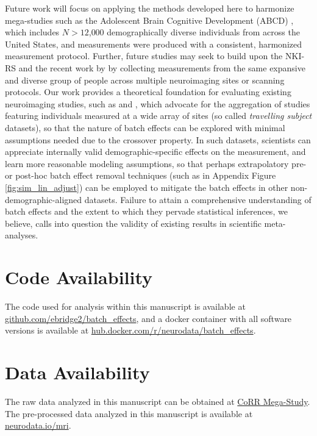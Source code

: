 {Future work will focus on applying the methods developed here to harmonize mega-studies such as the Adolescent Brain Cognitive Development (ABCD) \cite{Karcher2021Jan}, which includes $N>12$,$000$ demographically diverse individuals from across the United States, and measurements were produced with a consistent, harmonized measurement protocol. Further, future studies may seek to build upon the NKI-RS and the recent work by \citet{Noble2017Feb} by collecting measurements from the same expansive and diverse group of people across multiple neuroimaging sites or scanning protocols. Our work provides a theoretical foundation for evaluating existing neuroimaging studies, such as \citet{Noble2017Feb} and \cite{Yamashita2019Apr}, which advocate for the aggregation of studies featuring individuals measured at a wide array of sites (so called \textit{travelling subject} datasets), so that the nature of batch effects can be explored with minimal assumptions needed due to the crossover property. In such datasets, scientists can appreciate internally valid demographic-specific effects on the measurement, and learn more reasonable modeling assumptions, so that perhaps extrapolatory pre- or post-hoc batch effect removal techniques (such as in Appendix Figure \ref{fig:sim_lin_adjust}) can be employed to mitigate the batch effects in other non-demographic-aligned datasets. Failure to attain a comprehensive understanding of batch effects and the extent to which they pervade statistical inferences, we believe, calls into question the validity of existing results in scientific meta-analyses. 

\section*{Code Availability}

The code used for analysis within this manuscript is available at \\ \href{https://github.com/ebridge2/batch_effects}{github.com/ebridge2/batch\_effects}, and a docker container with all software versions is available at \href{https://hub.docker.com/r/neurodata/batch_effects}{hub.docker.com/r/neurodata/batch\_effects}.

\section*{Data Availability}

The raw data analyzed in this manuscript can be obtained at \href{http://fcon_1000.projects.nitrc.org/indi/CoRR/html/}{CoRR Mega-Study}. The pre-processed data analyzed in this manuscript is available at \href{https://neurodata.io/mri/}{neurodata.io/mri}.

}
